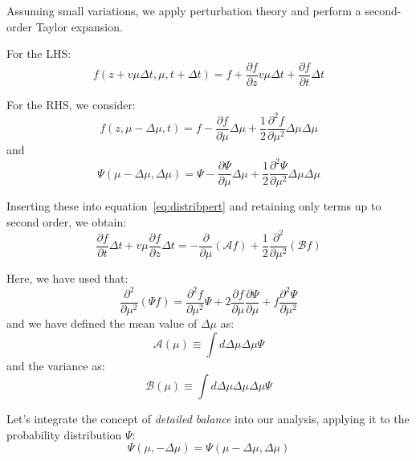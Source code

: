 Assuming small variations, we apply perturbation theory and perform a second-order Taylor expansion.

For the LHS:
%
\begin{equation}
f(z+v\mu\Delta t,\mu, t+\Delta t)=f+\frac{\partial f}{\partial z} v\mu \Delta t+\frac{\partial f}{\partial t} \Delta t
\end{equation}

For the RHS, we consider:
%
\begin{equation}
f(z,\mu-\Delta\mu,t)=f-\frac{\partial f}{\partial \mu}\Delta\mu +\frac{1}{2}\frac{\partial^2 f}{\partial \mu^2}\Delta\mu\Delta\mu 
\end{equation}
%
and
%
\begin{equation}
\Psi(\mu-\Delta\mu,\Delta\mu)=\Psi -\frac{\partial \Psi}{\partial \mu}\Delta\mu +\frac{1}{2}\frac{\partial^2 \Psi}{\partial \mu^2}\Delta\mu\Delta\mu 
\end{equation}

Inserting these into equation~\eqref{eq:distribpert} and retaining only terms up to second order, we obtain:
%
\begin{equation}\label{eq:fwithawithb}
\frac{\partial f}{\partial t} \Delta t  +  v \mu \frac{\partial f}{\partial z} \Delta t = 
-\frac{\partial}{\partial \mu} \left( \mathcal A f \right) + \frac{1}{2} \frac{\partial^2}{\partial\mu^2}\left(\mathcal B f \right)
\end{equation}

Here, we have used that:
%
\begin{equation}
\frac{\partial^2}{\partial\mu^2}\left(\Psi f\right) = \frac{\partial^2 f}{\partial\mu^2} \Psi +2\frac{\partial f}{\partial\mu}\frac{\partial\Psi}{\partial\mu}+f\frac{\partial^2 \Psi}{\partial\mu^2}
\end{equation}
%
and we have defined the mean value of \( \Delta\mu \) as:
%
\begin{equation}
\mathcal A(\mu) \equiv \int d\Delta\mu \Delta\mu \Psi
\end{equation}
%
and the variance as:
%
\begin{equation}
\mathcal B(\mu) \equiv \int d\Delta\mu \Delta\mu\Delta\mu \Psi
\end{equation}

Let's integrate the concept of \emph{detailed balance} into our analysis, applying it to the probability distribution \(\Psi\):
%
\begin{equation}
\Psi(\mu, -\Delta\mu ) = \Psi(\mu-\Delta\mu , \Delta\mu )
\end{equation}

